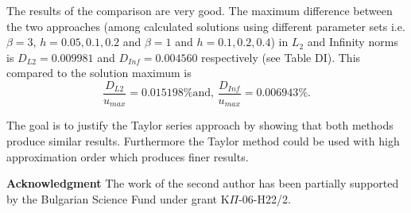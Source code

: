 \documentclass{article}
\begin{document}
The results of the comparison are very good. The maximum difference between the two approaches (among calculated solutions using different parameter sets i.e. $\beta = 3$,  $h = 0.05, 0.1, 0.2$ and $\beta = 1$ and  $h = 0.1, 0.2, 0.4$) in $L_2$ and Infinity norms is $D_{L2} = 0.009981$ and $D_{Inf} = 0.004560$ respectively (see Table DI). This compared to the solution maximum is
 $$\frac{ D_{L2} }{u_{max}} = 0.015198 \text{\%    and,   } \frac{D_{Inf} }{u_{max}} = 0.006943\text{\%.}$$

The goal is to justify the Taylor series approach by showing that both methods produce similar results. Furthermore the Taylor method could be used with high approximation order which produces finer results.





{\bf{Acknowledgment}}
The work of the second author has been partially supported by
the Bulgarian Science Fund under grant K$\Pi$-06-H22/2.
\end{document}
